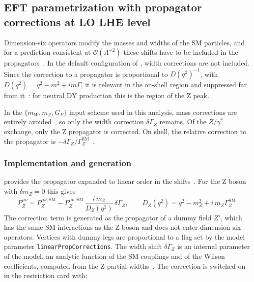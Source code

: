 \subsection{EFT parametrization with propagator corrections at LO LHE level}
\label{sec:eft_propcorr}

Dimension-six operators modify the masses and widths of the SM particles, and
for a prediction consistent at $\mathcal{O}(\Lambda^{-2})$ these shifts have to
be included in the propagators~\cite{Brivio:2020onw}.
In the default configuration of \smeftsim{}, width corrections are not
included. Since the correction to a propagator is proportional to
$D(q^2)^{-1}$, with $D(q^2) = q^2 - m^2 + i m\Gamma$, it is relevant in the
on-shell region and suppressed far from it~\cite{Brivio:2020onw}: for neutral
DY production this is the region of the Z peak.

In the $\{m_W, m_Z, G_F\}$ input scheme used in this analysis, mass corrections
are entirely avoided~\cite{Brivio:2020onw}, so only the width correction
$\delta\Gamma_Z$ remains. Of the $Z/\gamma^*$ exchange, only the Z propagator is
corrected. On shell, the relative correction to the propagator is
$-\delta\Gamma_Z/\Gamma_Z^{\mathrm{SM}}$~\cite[Eq.~(6.10)]{Brivio:2020onw}.

\subsubsection{Implementation and generation}

\smeftsim{} provides the propagator expanded to linear order in the
shifts~\cite{Brivio:2020onw}. For the Z boson with $\delta m_Z = 0$ this gives
\begin{equation}
  P_Z^{\mu\nu} = P_Z^{\mu\nu,\mathrm{SM}}
  - P_Z^{\mu\nu,\mathrm{SM}}\,\frac{i\, m_Z}{D_Z(q^2)}\,\delta\Gamma_Z ,
  \qquad D_Z(q^2) = q^2 - m_Z^2 + i\, m_Z \Gamma_Z^{\mathrm{SM}} .
  \label{eq:propcorr_linear}
\end{equation}
The correction term is generated as the propagator of a dummy field $Z'$, which
has the same SM interactions as the Z boson and does not enter dimension-six
operators. Vertices with dummy legs are proportional to a flag set by the model
parameter \texttt{linearPropCorrections}. The width shift $\delta\Gamma_Z$ is an internal parameter
of the model, an analytic function of the SM couplings and of the Wilson
coefficients, computed from the Z partial widths~\cite[App.~A]{Brivio:2020onw}.
The correction is switched on in the restriction card with:

